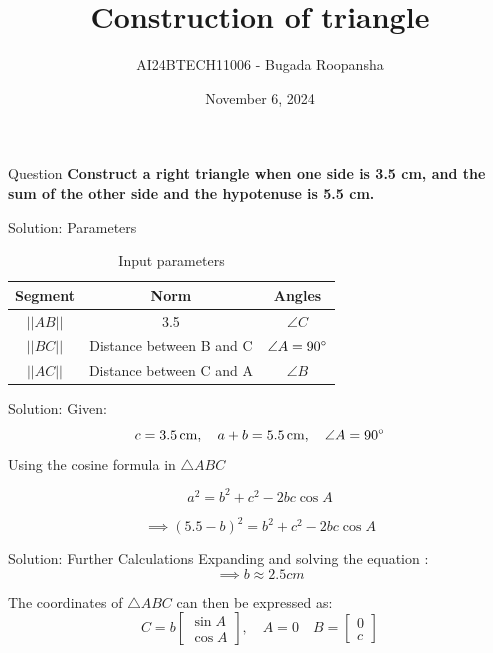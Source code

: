 \documentclass{beamer}
\title{Construction of triangle}
\author{AI24BTECH11006 - Bugada Roopansha}
\institute{IIT Hyderabad}
\date{November 6, 2024}
\begin{document}
\begin{frame}
    \titlepage
\end{frame}

\begin{frame}{Question}
    \textbf{Construct a right triangle when one side is 3.5 cm, and the sum of the other side and the hypotenuse is 5.5 cm.}
    
\end{frame}

\begin{frame}{Solution: Parameters}
    \begin{table}[h!]
        \centering
        \begin{tabular}{|c|c|c|}
            \hline
            \textbf{Segment} & \textbf{Norm} & \textbf{Angles} \\ \hline
            \( ||AB|| \) & 3.5 & $\angle{C}$ \\ \hline
            \( ||BC|| \) & Distance between B and C & $\angle{A}=90\degree$ \\ \hline
            \( ||AC||\) & Distance between C and A & $\angle{B} $ \\ \hline
        \end{tabular}
        \caption{Input parameters}
    \end{table}
\end{frame}

\begin{frame}{Solution:}
    Given:
    \[
    c = 3.5 \, \text{cm}, \quad a + b = 5.5 \, \text{cm},\quad \angle{A}=90\degree
    \]
    Using the cosine formula in $\triangle ABC$
    
    \[
    a^2 = b^2+c^2-2bc \cos A
    \]
    
    \[
    \implies (5.5 - b)^2 = b^2+c^2 -2bc \cos A
    \]
\end{frame}

\begin{frame}{Solution: Further Calculations}
    Expanding and solving the equation :
    \[
    \implies b \approx 2.5cm
    \]
    
    The coordinates of $\triangle ABC$ can then be expressed as:
    \[
    C=b \begin{bmatrix} \sin A \\ \cos A \end{bmatrix}, \quad
    A=0 \quad
    B=  \begin{bmatrix} 0 \\ c \end{bmatrix}
    \]
\end{frame}
\end{document}
